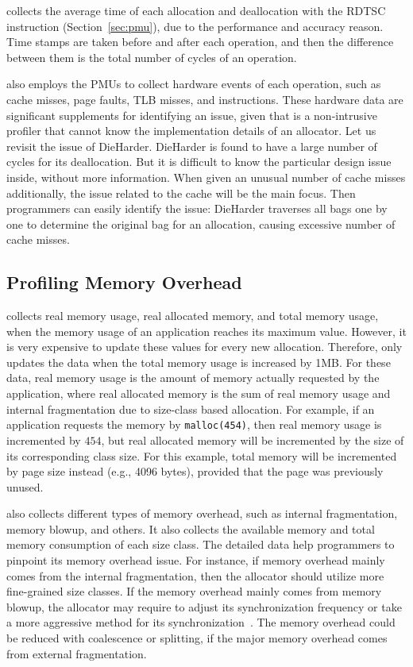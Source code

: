 \MP{} collects the average time of each allocation and deallocation with the RDTSC instruction (Section~\ref{sec:pmu}), due to the performance and accuracy reason. Time stamps are taken before and after each operation, and then the difference between them is  the total number of cycles of an operation. 

\MP{} also employs the PMUs to collect hardware events of each operation, such as cache misses, page faults, TLB misses, and instructions. These hardware data are  significant supplements for identifying an issue, given that \MP{} is a non-intrusive profiler that cannot know the implementation details of an allocator. Let us revisit the issue of DieHarder. DieHarder is found to have a large number of cycles for its deallocation. But it is difficult to know the particular design issue inside, without more information. When given an unusual number of cache misses additionally, the issue related to the cache will be the main focus. Then programmers can easily identify the issue: DieHarder traverses all bags one by one to determine the original bag for an allocation, causing excessive number of cache misses. 

  
\subsection{Profiling Memory Overhead}
\label{sec:profilingmemory}

\MP{} collects real memory usage, real allocated memory, and total memory usage, when the memory usage of an application reaches its maximum value. However, it is very expensive to update these values for every new allocation. Therefore, \MP{} only updates the data when the total memory usage is increased by 1MB. For these data, real memory usage is the amount of memory actually requested by the application, where real allocated memory is the sum of real memory usage and internal fragmentation due to size-class based allocation. For example, if an application requests the memory by \texttt{malloc(454)}, then real memory usage is incremented by $454$, but real allocated memory will be incremented by the size of its corresponding class size. For this example, total memory will be incremented by page size instead (e.g., 4096 bytes), provided that the page was previously unused. 

\MP{} also collects different types of memory overhead, such as internal fragmentation, memory blowup, and others. It also collects the available memory and total memory consumption of each size class. The detailed data help programmers to pinpoint its memory overhead issue. For instance, if memory overhead mainly comes from the internal fragmentation, then the allocator should utilize more fine-grained size classes. If the memory overhead mainly comes from memory blowup, the allocator may require to adjust its synchronization frequency or take a more aggressive method for its synchronization~\cite{DBLP:conf/iwmm/LiLD19}. The memory overhead could be reduced with coalescence or splitting, if the major memory overhead comes from external fragmentation. 

